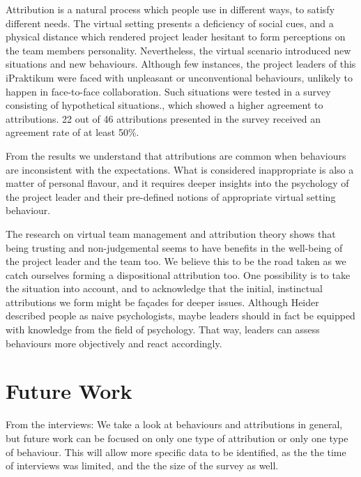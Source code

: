 Attribution is a natural process which people use in different ways, to satisfy different needs.  The virtual setting presents a deficiency of social cues, and a physical distance which rendered project leader hesitant to form perceptions on the team members personality.  Nevertheless, the virtual scenario introduced new situations and new behaviours. Although few instances, the project leaders of this iPraktikum were faced with unpleasant or unconventional behaviours, unlikely to happen in face-to-face collaboration. Such situations were tested in a survey consisting of hypothetical situations., which showed a higher agreement to attributions.  22 out of 46 attributions presented in the survey received an agreement rate of at least 50\%. 

From the results we understand that attributions are common when behaviours are inconsistent with the expectations.  What is considered inappropriate is also a matter of personal flavour, and it requires deeper insights into the psychology of the project leader and their pre-defined notions of appropriate virtual setting behaviour.

The research on virtual team management and attribution theory shows that being trusting and non-judgemental seems to have benefits in the well-being of the project leader and the team too.  We believe this to be the road taken as we catch ourselves forming a dispositional attribution too. One possibility is to take the situation into account, and to acknowledge that the initial,  instinctual attributions we form might be façades for deeper issues. Although Heider described people as naive psychologists, maybe leaders should in fact be equipped with knowledge from the field of psychology. That way, leaders can assess behaviours more objectively and react accordingly. 


\section{Future Work} \label{FutureWork}


From the interviews: We take a look at behaviours and attributions in general, but future work can be focused on only one type of attribution or only one type of behaviour. This will allow more specific data to be identified, as the the time of interviews was limited, and the the size of the survey as well. 

